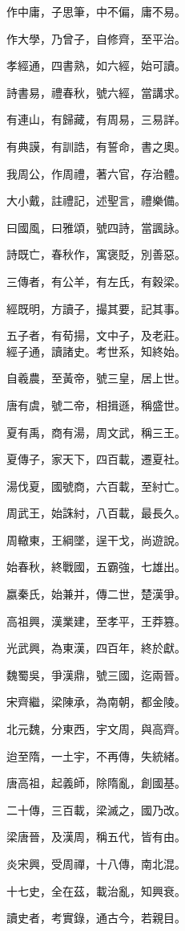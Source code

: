 \documentclass[20pt,a4paper,twocolumn]{article}
\begin{document}
\begin{Large}
作中庸，子思筆，中不偏，庸不易。

作大學，乃曾子，自修齊，至平治。

孝經通，四書熟，如六經，始可讀。

詩書易，禮春秋，號六經，當講求。

有連山，有歸藏，有周易，三易詳。

有典謨，有訓誥，有誓命，書之奧。

我周公，作周禮，著六官，存治體。

大小戴，註禮記，述聖言，禮樂備。

曰國風，曰雅頌，號四詩，當諷詠。

詩既亡，春秋作，寓褒貶，別善惡。

三傳者，有公羊，有左氏，有穀梁。

經既明，方讀子，撮其要，記其事。

五子者，有荀揚，文中子，及老莊。
\\

經子通，讀諸史。考世系，知終始。

自羲農，至黃帝，號三皇，居上世。

唐有虞，號二帝，相揖遜，稱盛世。

夏有禹，商有湯，周文武，稱三王。

夏傳子，家天下，四百載，遷夏社。

湯伐夏，國號商，六百載，至紂亡。

周武王，始誅紂，八百載，最長久。

周轍東，王綱墜，逞干戈，尚遊說。

始春秋，終戰國，五霸強，七雄出。

嬴秦氏，始兼并，傳二世，楚漢爭。

高祖興，漢業建，至孝平，王莽篡。

光武興，為東漢，四百年，終於獻。

魏蜀吳，爭漢鼎，號三國，迄兩晉。

宋齊繼，梁陳承，為南朝，都金陵。

北元魏，分東西，宇文周，與高齊。

迨至隋，一土宇，不再傳，失統緒。

唐高祖，起義師，除隋亂，創國基。

二十傳，三百載，梁滅之，國乃改。

梁唐晉，及漢周，稱五代，皆有由。

炎宋興，受周禪，十八傳，南北混。

十七史，全在茲，載治亂，知興衰。

讀史者，考實錄，通古今，若親目。


\end{Large}
\end{document}
